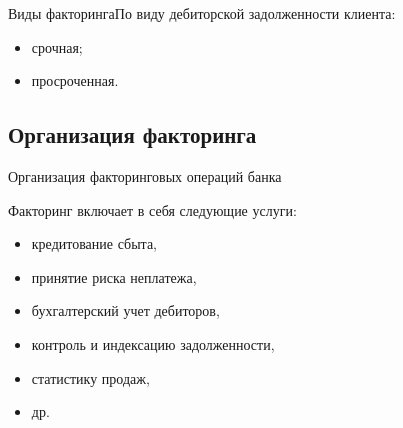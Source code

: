 \documentclass[_Banking_p3.tex]{subfiles}
\begin{document}
\begin{frame} {Виды факторинга}{По виду дебиторской задолженности клиента:}
\begin{itemize}[<+->]
\item
срочная;

\item
просроченная.
\end{itemize}

\end{frame}

\subsection{Организация факторинга}
\begin{frame}{Организация факторинговых операций банка}

Факторинг включает в себя следующие услуги: 
\begin{itemize}[<+->]
\item
кредитование сбыта, 
\item
принятие риска неплатежа, 
\item
бухгалтерский учет дебиторов, 
\item
контроль и индексацию задолженности, 
\item
статистику продаж, 
\item
др.

\end{itemize}
\end{frame}
\end{document}
